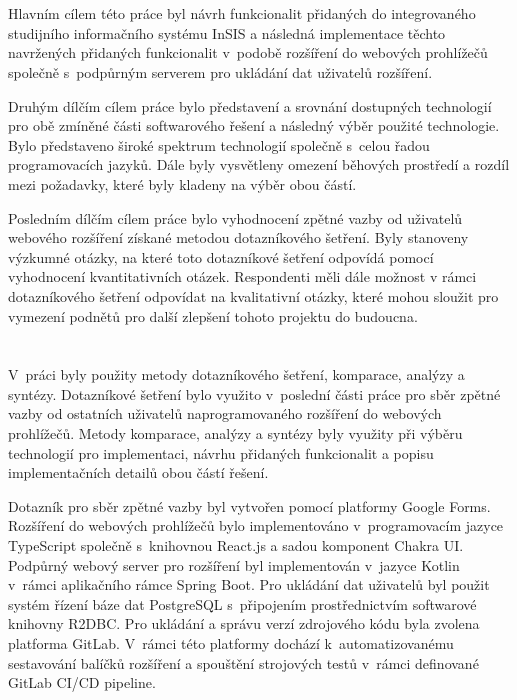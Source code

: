\section*{\CilPrace}

Hlavním cílem této práce byl návrh funkcionalit přidaných do integrovaného studijního informačního systému InSIS a následná implementace těchto navržených přidaných funkcionalit v~podobě rozšíření do webových prohlížečů společně s~podpůrným serverem pro ukládání dat uživatelů rozšíření. 

Druhým dílčím cílem práce bylo představení a srovnání dostupných technologií pro obě zmíněné části softwarového řešení a následný výběr použité technologie. Bylo představeno široké spektrum technologií společně s~celou řadou programovacích jazyků. Dále byly vysvětleny omezení běhových prostředí a rozdíl mezi požadavky, které byly kladeny na výběr obou částí.  

Posledním dílčím cílem práce bylo vyhodnocení zpětné vazby od uživatelů webového rozšíření získané metodou dotazníkového šetření. Byly stanoveny výzkumné otázky, na které toto dotazníkové šetření odpovídá pomocí vyhodnocení kvantitativních otázek. Respondenti měli dále možnost v rámci dotazníkového šetření odpovídat na kvalitativní otázky, které mohou sloužit pro vymezení podnětů pro další zlepšení tohoto projektu do budoucna. 

\section*{\PouziteMetody}

V~práci byly použity metody dotazníkového šetření, komparace, analýzy a syntézy. Dotazníkové šetření bylo využito v~poslední části práce pro sběr zpětné vazby od ostatních uživatelů naprogramovaného rozšíření do webových prohlížečů. Metody komparace, analýzy a syntézy byly využity při výběru technologií pro implementaci, návrhu přidaných funkcionalit a popisu implementačních detailů obou částí řešení.    

Dotazník pro sběr zpětné vazby byl vytvořen pomocí platformy Google Forms. Rozšíření do webových prohlížečů bylo implementováno v~programovacím jazyce TypeScript společně s~knihovnou React.js a sadou komponent Chakra UI. Podpůrný webový server pro rozšíření byl implementován v~jazyce Kotlin v~rámci aplikačního rámce Spring Boot. Pro ukládání dat uživatelů byl použit systém řízení báze dat PostgreSQL s~připojením prostřednictvím softwarové knihovny R2DBC. Pro ukládání a správu verzí zdrojového kódu byla zvolena platforma GitLab. V~rámci této platformy dochází k~automatizovanému sestavování balíčků rozšíření a spouštění strojových testů v~rámci definované GitLab CI/CD pipeline.

